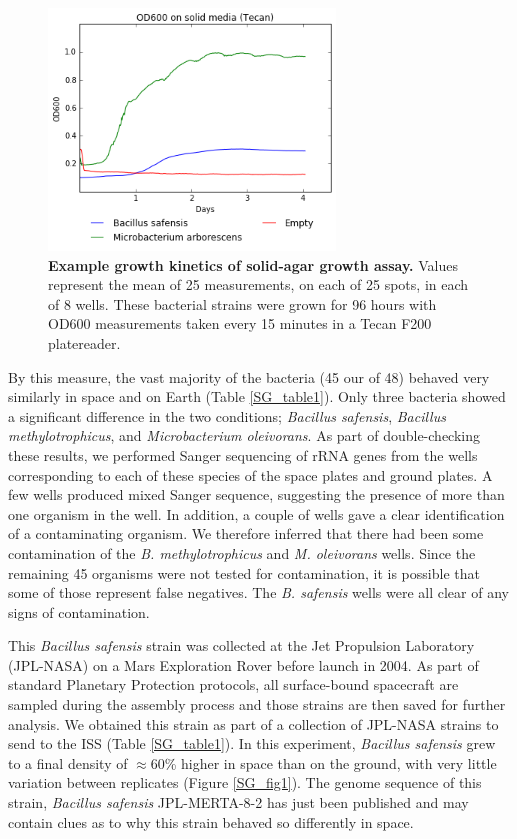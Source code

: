 \begin{figure}
    \centering
    \includegraphics[width=3in]{SpaceGrowth/figures/fig2.png}
    \caption{\textbf{Example growth kinetics of solid-agar growth assay.} Values represent the mean of 25 measurements, on each of 25 spots, in each of 8 wells. These bacterial strains were grown for 96 hours with OD600 measurements taken every 15 minutes in a Tecan F200 platereader.}
    \label{SG_fig2}
\end{figure}

By this measure, the vast majority of the bacteria (45 our of 48) behaved very similarly in space and on Earth (Table \ref{SG_table1}). Only three bacteria showed a significant difference in the two conditions; {\em Bacillus safensis}, {\em Bacillus methylotrophicus}, and {\em Microbacterium oleivorans}. As part of double-checking these results, we performed Sanger sequencing of rRNA genes from the wells corresponding to each of these species of the space plates and ground plates. A few wells produced mixed Sanger sequence, suggesting the presence of more than one organism in the well. In addition, a couple of wells gave a clear identification of a contaminating organism. We therefore inferred that there had been some contamination of the {\em B. methylotrophicus} and {\em M. oleivorans} wells. Since the remaining 45 organisms were not tested for contamination, it is possible that some of those represent false negatives. The {\em B. safensis} wells were all clear of any signs of contamination.



This {\em Bacillus safensis} strain was collected at the Jet Propulsion Laboratory (JPL-NASA) on a Mars Exploration Rover before launch in 2004. As part of standard Planetary Protection protocols, all surface-bound spacecraft are sampled during the assembly process and those strains are then saved for further analysis. We obtained this strain as part of a collection of JPL-NASA strains to send to the ISS (Table \ref{SG_table1}). In this experiment, {\em Bacillus safensis} grew to a final density of $\approx 60$\% higher in space than on the ground, with very little variation between replicates (Figure \ref{SG_fig1}). The genome sequence of this strain, {\em Bacillus safensis} JPL-MERTA-8-2 has just been published \cite{coil2015draft} and may contain clues as to why this strain behaved so differently in space.

